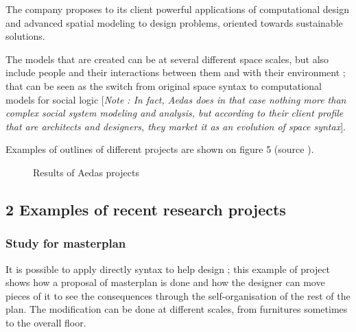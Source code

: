 \documentclass[english]{article}
\newcommand{\lyxdot}{.}
\begin{document}
The company proposes to its client powerful applications of computational
design and advanced spatial modeling to design problems, oriented
towards sustainable solutions.

\bigskip{}


The models that are created can be at several different space scales,
but also include people and their interactions between them and with
their environment ; that can be seen as the switch from original space
syntax to computational models for social logic {[}\textit{Note :
In fact, Aedas does in that case nothing more than complex social
system modeling and analysis, but according to their client profile
that are architects and designers, they market it as an evolution
of space syntax}{]}.

\bigskip{}


Examples of outlines of different projects are shown on figure 5 (source
\cite{AedasWeb}).

\begin{figure}[h]
\hfill{}\hfill{}\hfill{}\hfill{}

\hfill{}\hfill{}\hfill{}\caption{Results of Aedas projects}


\end{figure}



\subsection*{2 Examples of recent research projects}


\subsubsection*{Study for masterplan}

It is possible to apply directly syntax to help design ; this example
of project shows how a proposal of masterplan is done and how the
designer can move pieces of it to see the consequences through the
self-organisation of the rest of the plan. The modification can be
done at different scales, from furnitures sometimes to the overall
floor.
\end{document}

